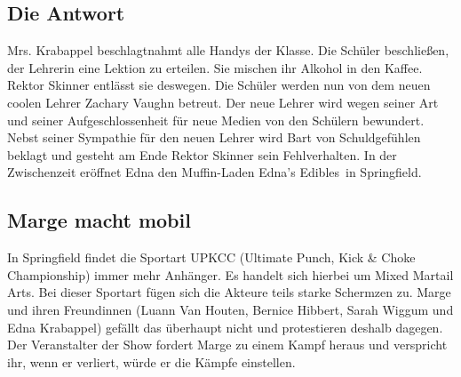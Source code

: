 
\subsection{Die Antwort}\label{LABF15}
Mrs. Krabappel beschlagtnahmt alle Handys der Klasse. Die Schüler beschließen, der Lehrerin eine Lektion zu erteilen. Sie mischen ihr Alkohol in den Kaffee. Rektor Skinner entlässt sie deswegen. Die Schüler werden nun von dem neuen coolen Lehrer Zachary Vaughn betreut. Der neue Lehrer wird wegen seiner Art und seiner Aufgeschlossenheit für neue Medien von den Schülern bewundert. Nebst seiner Sympathie für den neuen Lehrer wird Bart von Schuldgefühlen beklagt und gesteht am Ende Rektor Skinner sein Fehlverhalten. In der Zwischenzeit eröffnet Edna den Muffin-Laden \glqq Edna's Edibles\grqq\ in Springfield.


\subsection{Marge macht mobil}\label{LABF16}
In Springfield findet die Sportart UPKCC (Ultimate Punch, Kick \& Choke Championship) immer mehr Anhänger. Es handelt sich hierbei um \glqq Mixed Martail Arts\grqq . Bei dieser Sportart fügen sich die Akteure teils starke Schermzen zu. Marge und ihren Freundinnen (Luann Van Houten, Bernice Hibbert, Sarah Wiggum und Edna Krabappel) gefällt das überhaupt nicht und protestieren deshalb dagegen. Der Veranstalter der Show fordert Marge zu einem Kampf heraus und verspricht ihr, wenn er verliert, würde er die Kämpfe einstellen.

